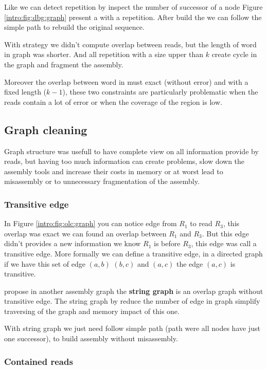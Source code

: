 \documentclass[./main.tex]{subfiles}
\begin{document}
Like \OLC we can detect repetition by inspect the number of successor of a node Figure \ref{intro:fig:dbg:graph} present a \DBG with a repetition. After build the \DBG we can follow the simple path to rebuild the original sequence.

With \DBG strategy we didn't compute overlap between reads, but the length of word in graph was shorter. And all repetition with a size upper than $k$ create cycle in the graph and fragment the assembly.

Moreover the overlap between word in \DBG must exact (without error) and with a fixed length ($k - 1$), these two constraints are particularly problematic when the reads contain a lot of error or when the coverage of the region is low.

\subsection{Graph cleaning}

Graph structure was usefull to have complete view on all information provide by reads, but having too much information can create problems, slow down the assembly tools and increase their costs in memory or at worst lead to misassembly or to unnecessary fragmentation of the assembly.

\subsubsection{Transitive edge}

In Figure \ref{intro:fig:olc:graph} you can notice edge from $R_1$ to read $R_3$, this overlap was exact we can found an overlap between $R_1$ and $R_3$. But this edge didn't provides a new information we know $R_1$ is before $R_3$, this edge was call a transitive edge. More formally we can define a transitive edge, in a directed graph if we have this set of edge $(a, b)$ $(b, c)$ and $(a, c)$ the edge $(a, c)$ is transitive.

\citeauthor{string_graph} propose in \cite{string_graph} another assembly graph the \textbf{string graph} is an overlap graph without transitive edge. The string graph by reduce the number of edge in graph simplify traversing of the graph and memory impact of this one.

With string graph we just need follow simple path (path were all nodes have just one successor), to build assembly without misassembly.

\subsubsection{Contained reads}
\end{document}
